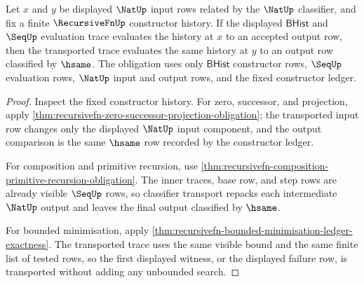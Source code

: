 \begin{theorem}
\label{thm:recursivefn-nat-input-stability-obligation}
Let $x$ and $y$ be displayed $\NatUp$ input rows related by the $\NatUp$
classifier, and fix a finite $\RecursiveFnUp$ constructor history. If the
displayed $\mathsf{BHist}$ and $\SeqUp$ evaluation trace evaluates the history
at $x$ to an accepted output row, then the transported trace evaluates the same
history at $y$ to an output row classified by $\hsame$. The obligation uses
only $\mathsf{BHist}$ constructor rows, $\SeqUp$ evaluation rows, $\NatUp$
input and output rows, and the fixed constructor ledger.
\end{theorem}
\begin{proof}
Inspect the fixed constructor history. For zero, successor, and projection,
apply \autoref{thm:recursivefn-zero-successor-projection-obligation}; the
transported input row changes only the displayed $\NatUp$ input component, and
the output comparison is the same $\hsame$ row recorded by the constructor
ledger.

For composition and primitive recursion, use
\autoref{thm:recursivefn-composition-primitive-recursion-obligation}. The
inner traces, base row, and step rows are already visible $\SeqUp$ rows, so
classifier transport repacks each intermediate $\NatUp$ output and leaves the
final output classified by $\hsame$.

For bounded minimisation, apply
\autoref{thm:recursivefn-bounded-minimisation-ledger-exactness}. The
transported trace uses the same visible bound and the same finite list of
tested rows, so the first displayed witness, or the displayed failure row, is
transported without adding any unbounded search.
\end{proof}

